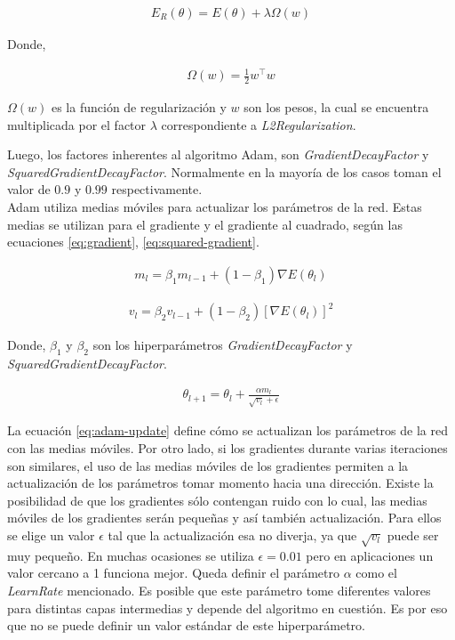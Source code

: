 \begin{align} \label{eq:l2-regularization}
E_R(\theta) = E(\theta) + \lambda \Omega(w)
\end{align}

Donde,

\begin{align}
  \Omega(w) = \frac{1}{2} w^\top w
\end{align}

\indent $\Omega(w)$ es la función de regularización y $w$ son los pesos, la cual se encuentra multiplicada por el
factor $\lambda$ correspondiente a \textit{L2Regularization}. \bigskip

\indent Luego, los factores inherentes al algoritmo Adam, son \textit{GradientDecayFactor} y
\textit{SquaredGradientDecayFactor}. Normalmente en la mayoría de los casos toman el valor de $0.9$ y $0.99$
respectivamente. \\
\indent Adam utiliza medias móviles para actualizar los parámetros de la red. Estas medias se utilizan para el
gradiente y el gradiente al cuadrado, según las ecuaciones \ref{eq:gradient}, \ref{eq:squared-gradient}.

\begin{align} \label{eq:gradient}
  m_l = \beta_1 m_{l-1} + (1-\beta_1) \nabla E(\theta_l)
\end{align}

\begin{align} \label{eq:squared-gradient}
  v_l = \beta_2 v_{l-1} + (1-\beta_2) [\nabla E(\theta_l)]^2
\end{align}

Donde, $\beta_1$ y $\beta_2$ son los hiperparámetros \textit{GradientDecayFactor} y \textit{SquaredGradientDecayFactor}.

\begin{align} \label{eq:adam-update}
  \theta_{l+1} = \theta_l + \frac{\alpha m_l}{\sqrt{v_l}+\epsilon}
\end{align}

\indent La ecuación \ref{eq:adam-update} define cómo se actualizan los parámetros de la red con las medias móviles.
Por otro lado, si los gradientes durante varias iteraciones son similares, el uso de las medias móviles de los
gradientes permiten a la actualización de los parámetros tomar momento hacia una dirección. Existe la posibilidad de
que los gradientes sólo contengan ruido con lo cual, las medias móviles de los gradientes serán pequeñas y así
también actualización. Para ellos se elige un valor $\epsilon$ tal que la actualización esa no diverja, ya que
$\sqrt{v_l}$ puede ser muy pequeño. En muchas ocasiones se utiliza $\epsilon = 0.01$ pero en aplicaciones un valor
cercano a 1 funciona mejor. Queda definir el parámetro $\alpha$ como el \textit{LearnRate} mencionado. Es posible
que este parámetro tome diferentes valores para distintas capas intermedias y depende del algoritmo en cuestión. Es
por eso que no se puede definir un valor estándar de este hiperparámetro. \bigskip

